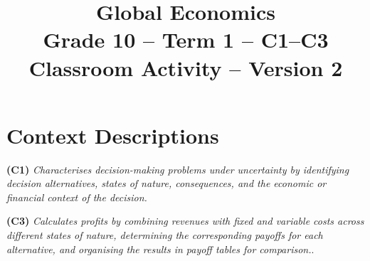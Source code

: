 \makeatletter
{}
\makeatother







\title{\vspace{-15mm} \textbf{Global Economics}\\
	Grade 10 -- Term 1 -- C1--C3 Classroom Activity -- Version 2}
\author{}
\date{}
\pagestyle{empty}

\geometry{
	margin=0.3in,
	bottom=0.3in,
	top=0.3in
}




	\maketitle\thispagestyle{empty}
	\vspace{-25mm}

	\section*{Context Descriptions}
	\vspace{-3mm}

	\textbf{(C1)} \textit{Characterises decision-making problems under uncertainty by identifying decision alternatives, states of nature, consequences, and the economic or financial context of the decision.} 
	
	\textbf{(C3)} \textit{Calculates profits by combining revenues with fixed and variable costs across different states of nature, determining the corresponding payoffs for each alternative, and organising the results in payoff tables for comparison.}.
	
